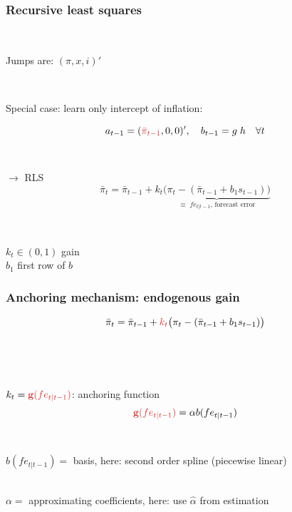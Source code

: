 \documentclass[11pt]{beamer}
\begin{document}
\begin{frame}
	\frametitle{Recursive least squares}
	\label{RLS_special}
	
	\
	
Jumps are: $(\pi, x, i)'$ 	

\
\pause
\

Special case: learn only intercept of inflation:

\begin{equation}
a_{t-1} = ( \textcolor{brownreddark}{\bar{\pi}_{t-1}},0,0)', \quad b_{t-1} = g\; h \quad \forall t
\end{equation}

\
\pause
\

$\rightarrow$ RLS
\begin{equation}
\bar{\pi}_{t}  =\bar{\pi}_{t-1} +k_t \underbrace{\big(\pi_{t} -(\bar{\pi}_{t-1}+b_1 s_{t-1}) \big)}_{\equiv \; fe_{t|t-1} \text{, forecast error} } 
\end{equation}
 
 \
 
 $k_t \in (0,1)$ gain \\
 $b_1$ first row of $b$
\vfill 

\hfill \hyperlink{RLS}{}




\end{frame}

\begin{frame}
	\frametitle{Anchoring mechanism: endogenous gain}
	\label{anchoring1}


\begin{equation}
\bar{\pi}_{t}  =\bar{\pi}_{t-1} + \textcolor{brownreddark}{k_t}\big(\pi_{t} -(\bar{\pi}_{t-1}+b_1 s_{t-1}) \big)
\end{equation}

\

\

$k_t = \textcolor{brownreddark}{\mathbf{g}(fe_{t|t-1})}$: anchoring function
\pause
\begin{equation}
 \textcolor{brownreddark}{\mathbf{g}(fe_{t|t-1})} = \alpha b(fe_{t|t-1})\label{gain}
\end{equation}

\

$ b(fe_{t|t-1}) = $ basis, here: second order spline (piecewise linear) \\

\

$\alpha  = $ approximating coefficients, here: use $\hat{\alpha}$ from estimation

\vfill 

\hfill \hyperlink{g}{}



\end{frame}
\end{document}
